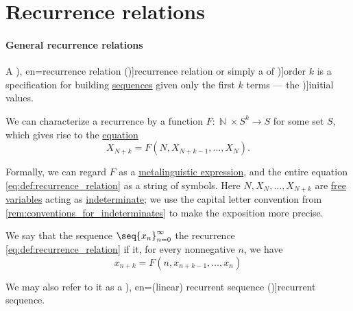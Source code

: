 \section{Recurrence relations}\label{sec:recurrence_relations}

\paragraph{General recurrence relations}

\begin{definition}\label{def:recurrence_relation}\mimprovised
  A \term[ru=рекуррентное уравнение (\cite[21]{Юмагулов2015ДинамическиеСистемы}), en=recurrence relation (\cite[def. 2.4.4]{Rosen2019DiscreteMathematics})]{recurrence relation} or simply a  of \term[en=order (of linear recurring sequence) (\cite[395]{LidlNiederreiter1997FiniteFields})]{order} \( k \) is a specification for building \hyperref[def:sequence]{sequences} given only the first \( k \) terms --- the \term[en=initial values (\cite[396]{LidlNiederreiter1997FiniteFields})]{initial values}.

  We can characterize a recurrence by a function \( F: \BbbN \times S^k \to S \) for some set \( S \), which gives rise to the \hyperref[def:equation]{equation}
  \begin{equation}\label{eq:def:recurrence_relation}
    X_{N+k} = F(N, X_{N+k-1}, \ldots, X_N).
  \end{equation}

  Formally, we can regard \( F \) as a \hyperref[con:expression]{metalinguistic expression}, and the entire equation \eqref{eq:def:recurrence_relation} as a string of symbols. Here \( N, X_N, \ldots, X_{N+k} \) are \hyperref[con:variable_binding]{free variables} acting as \hyperref[con:free_construction/indeterminate]{indeterminate}; we use the capital letter convention from \cref{rem:conventions_for_indeterminates} to make the exposition more precise.

  \begin{thmenum}
     We say that the sequence \( \seq{ x_n }_{n=0}^\infty \)  the recurrence \eqref{eq:def:recurrence_relation} if it, for every nonnegative \( n \), we have
    \begin{equation}\label{eq:def:recurrence_relation/sequence}
      x_{n+k} = F(n, x_{n+k-1}, \ldots, x_n)
    \end{equation}

    We may also refer to it as a \term[ru=рекуррентная последовательность (\cite[21]{Юмагулов2015ДинамическиеСистемы}), en=(linear) recurrent sequence (\cite[395]{LidlNiederreiter1997FiniteFields})]{recurrent sequence}.


\end{thmenum}
\end{definition}
